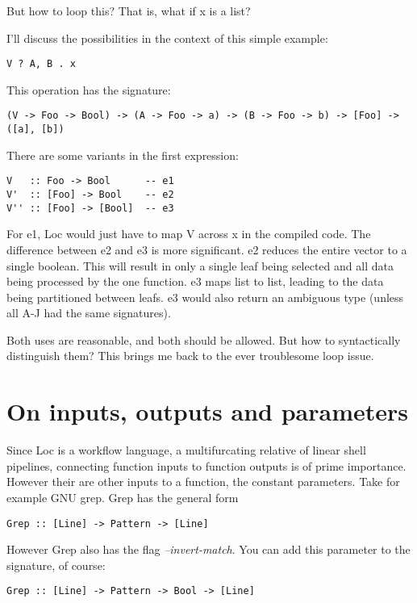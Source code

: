 \documentclass[12pt]{article}
\begin{document}
But how to loop this? That is, what if x is a list?

I'll discuss the possibilities in the context of this simple example:

\begin{verbatim}
V ? A, B . x
\end{verbatim}

This operation has the signature:

\begin{verbatim}
(V -> Foo -> Bool) -> (A -> Foo -> a) -> (B -> Foo -> b) -> [Foo] -> ([a], [b])
\end{verbatim}

There are some variants in the first expression:

\begin{verbatim}
V   :: Foo -> Bool      -- e1
V'  :: [Foo] -> Bool    -- e2
V'' :: [Foo] -> [Bool]  -- e3
\end{verbatim}

For e1, Loc would just have to map V across x in the compiled code. The
difference between e2 and e3 is more significant. e2 reduces the entire vector
to a single boolean. This will result in only a single leaf being selected and
all data being processed by the one function. e3 maps list to list, leading to
the data being partitioned between leafs. e3 would also return an ambiguous
type (unless all A-J had the same signatures).

Both uses are reasonable, and both should be allowed. But how to syntactically
distinguish them? This brings me back to the ever troublesome loop issue.

\section{On inputs, outputs and parameters}

Since Loc is a workflow language, a multifurcating relative of linear shell
pipelines, connecting function inputs to function outputs is of prime
importance. However their are other inputs to a function, the constant
parameters. Take for example GNU grep. Grep has the general form

\begin{verbatim}
Grep :: [Line] -> Pattern -> [Line]
\end{verbatim}

However Grep also has the flag {\it --invert-match}. You can add this parameter to the signature, of course:

\begin{verbatim}
Grep :: [Line] -> Pattern -> Bool -> [Line]
\end{verbatim}
\end{document}
